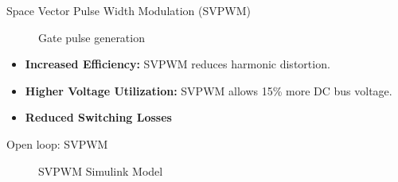 \begin{frame}{Space Vector Pulse Width Modulation (SVPWM)}

	\begin{figure}
		\centering
		\caption{Gate pulse generation}
	\end{figure}

	\begin{itemize}
		\item \textbf{Increased Efficiency:} SVPWM reduces harmonic distortion.
		\item \textbf{Higher Voltage Utilization:} SVPWM allows 15\% more DC bus voltage.
		\item \textbf{Reduced Switching Losses}
	\end{itemize}	

\end{frame}



\begin{frame}{Open loop: SVPWM}
	\begin{figure}
		\centering
		\caption{SVPWM Simulink Model}
	\end{figure}
\end{frame}


